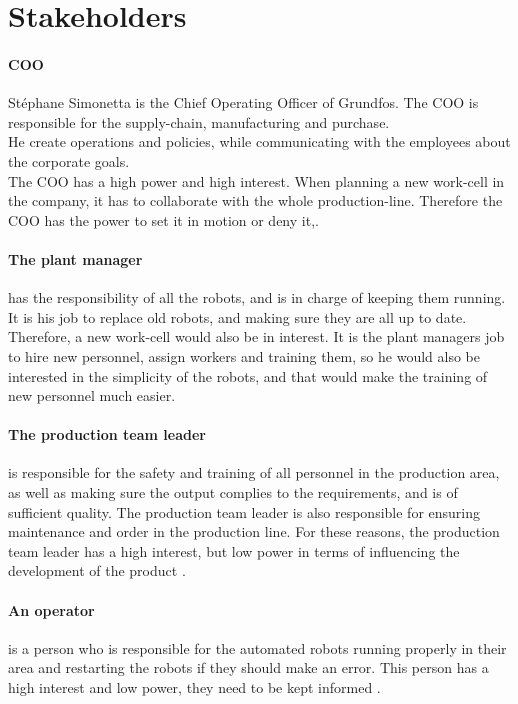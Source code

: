 \section{Stakeholders}


\paragraph{COO}\label{ch:grundfosas-CEO}
Stéphane Simonetta is the Chief Operating Officer of Grundfos. The COO is responsible for the supply-chain, manufacturing and purchase.\\ 
He create operations and policies, while communicating with the employees about the corporate goals.\\
The COO has a high power and high interest. When planning a new work-cell in the company, it has to collaborate with the whole production-line. Therefore the COO has the power to set it in motion or deny it\cite{Grundfos},\cite{COO}.

\paragraph{The plant manager}\label{ch:Plant-manager} 
 has the responsibility of all the robots, and is in charge of keeping them running. It is his job to replace old robots, and making sure they are all up to date. Therefore, a new work-cell would also be in interest. It is the plant managers job to hire new personnel, assign workers and training them, so he would also be interested in the simplicity of the robots, and that would make the training of new personnel much easier\cite{plantmanager}.

\paragraph{The production team leader}\label{ch:Production-team-leader}
 is responsible for the safety and training of all personnel in the production area, as well as making sure the output complies to the requirements, and is of sufficient quality. The production team leader is also responsible for ensuring maintenance and order in the production line. For these reasons, the production team leader has a high interest, but low power in terms of influencing the development of the product \cite{Productionteamleader}.

\paragraph{An operator}\label{ch:grundfosemp-stake}
 is a person who is responsible for the automated robots running properly in their area and restarting the robots if they should make an error. This person has a high interest and low power, they need to be kept informed \cite{Operator}.

